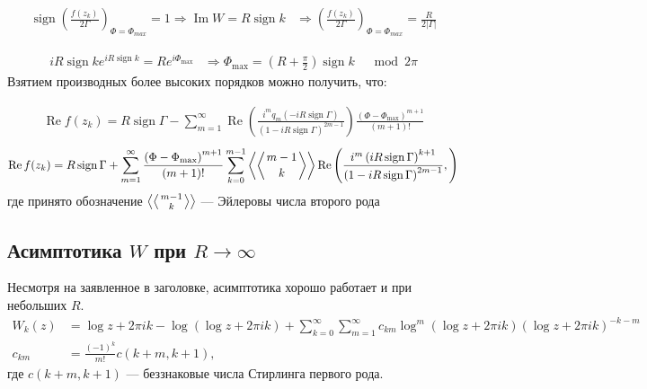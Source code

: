 \documentclass[a4paper, 12pt]{article}
\DeclareMathOperator*{\sign}{sign}
\DeclareMathOperator*{\Real}{Re}
\DeclareMathOperator*{\Imag}{Im}
\newenvironment{eqw}{\begin{equation} \begin{aligned}}   
    {\end{aligned}    \end{equation}}
\begin{document}
\begin{eqw}
    \sign\left(\frac{f(z_k)}{2\Gamma}\right)_{\Phi = \Phi_{max}} = 1 \Rightarrow \Imag W = R\sign k 
    &\Rightarrow \left(\frac{f(z_k)}{2\Gamma}\right)_{\Phi = \Phi_{max}} = \frac{R}{2|\Gamma|}
\end{eqw}

\begin{eqw}
    i R \sign k  e^{i R \sign k } = R e^{i\Phi_{\max}} &\Rightarrow \Phi_{\max} = \left(R+\frac{\pi}{2}\right)\sign k \;\;\; \mod 2\pi
\end{eqw}
Взятием производных более высоких порядков можно получить, что:

\begin{eqw}
    \Real f(z_k) = R\sign \Gamma - \sum\limits_{m=1}^{\infty} \Real\left(\frac{i^m q_{m}\left(-iR\sign \Gamma\right)}{\left(1-iR\sign \Gamma\right)^{2m-1}}\right)\frac{\left(\Phi - \Phi_{\max}\right)^{m+1}}{(m+1)!}
\end{eqw}
\begin{eqw}
    \Real f(z_k) = R\sign \Gamma + \sum\limits_{m=1}^{\infty} \frac{\left(\Phi - \Phi_{\max}\right)^{m+1}}{(m+1)!}
    \sum\limits_{k=0}^{m-1}\left\langle\left\langle{m-1}\atop {k}\right\rangle\right\rangle 
    \Real\left(\frac{i^{m}\left(i R\sign \Gamma\right)^{k+1} }{\left(1-iR\sign\Gamma\right)^{2m-1}},\right)
\end{eqw}
где принято обозначение $\left\langle\left\langle{m-1}\atop {k}\right\rangle\right\rangle$ --- Эйлеровы числа второго рода
\subsection*{Асимптотика $W$ при $R \to \infty$}
Несмотря на заявленное в заголовке, асимптотика хорошо работает и при небольших $R$.
\begin{eqw}
    W_k(z) &= \log z + 2\pi i k - \log\left(\log z + 2\pi i k\right) + \sum\limits_{k=0}^{\infty}\sum\limits_{m=1}^{\infty} c_{km}\log^m\left(\log z + 2\pi i k\right)\left(\log z + 2\pi i k \right)^{-k-m}\\
    c_{km} &= \frac{(-1)^k}{m!} c(k+m, k+1),
\end{eqw}
где $c(k+m, k+1)$ ---  беззнаковые числа Стирлинга первого рода.

\end{document}
